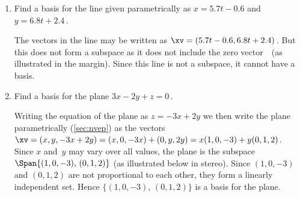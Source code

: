 \begin{example}
\begin{enumerate}
\item Find a basis for the line given parametrically as \(x=5.7t-0.6\) and \(y=6.8t+2.4\)\,.
\begin{solution} 
The vectors in the line may be written as \(\xv=(5.7t-0.6,6.8t+2.4)\)\,.
But this does not form a subspace as it does not include the zero vector~\ov\ (as illustrated in the margin). 
Since this line is not a subspace, it cannot have a basis.
\end{solution}




\item Find a basis for the plane \(3x-2y+z=0\)\,.
\begin{solution} 
Writing the equation of the plane as \(z=-3x+2y\) we then write the plane parametrically (\cref{sec:nvep}) as the vectors \(\xv=(x,y,-3x+2y) =(x,0,-3x)+(0,y,2y) =x(1,0,-3) +y(0,1,2)\).
Since \(x\) and~\(y\) may vary over all values, the plane is the subspace \(\Span\{(1,0,-3),\,(0,1,2)\}\) (as illustrated below in stereo).
Since \((1,0,-3)\) and \((0,1,2)\) are not proportional to each other, they form a linearly independent set.
Hence \(\{(1,0,-3),\,(0,1,2)\}\) is a basis for the plane.
\begin{center}
 {}
\end{center}
\end{solution}





\end{enumerate}
\end{example}

